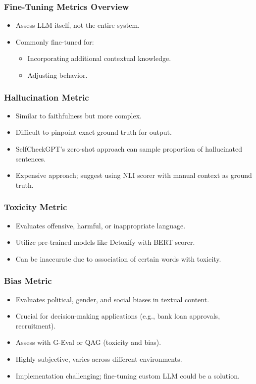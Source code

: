 \begin{frame}[fragile]\frametitle{Fine-Tuning Metrics Overview}
  \begin{itemize}
    \item Assess LLM itself, not the entire system.
    \item Commonly fine-tuned for:
      \begin{itemize}
        \item Incorporating additional contextual knowledge.
        \item Adjusting behavior.
      \end{itemize}
  \end{itemize}
\end{frame}

\begin{frame}[fragile]\frametitle{Hallucination Metric}
  \begin{itemize}
    \item Similar to faithfulness but more complex.
    \item Difficult to pinpoint exact ground truth for output.
    \item SelfCheckGPT's zero-shot approach can sample proportion of hallucinated sentences.
    \item Expensive approach; suggest using NLI scorer with manual context as ground truth.
  \end{itemize}
\end{frame}

\begin{frame}[fragile]\frametitle{Toxicity Metric}
  \begin{itemize}
    \item Evaluates offensive, harmful, or inappropriate language.
    \item Utilize pre-trained models like Detoxify with BERT scorer.
    \item Can be inaccurate due to association of certain words with toxicity.
  \end{itemize}
\end{frame}

\begin{frame}[fragile]\frametitle{Bias Metric}
  \begin{itemize}
    \item Evaluates political, gender, and social biases in textual content.
    \item Crucial for decision-making applications (e.g., bank loan approvals, recruitment).
    \item Assess with G-Eval or QAG (toxicity and bias).
    \item Highly subjective, varies across different environments.
    \item Implementation challenging; fine-tuning custom LLM could be a solution.
  \end{itemize}
\end{frame}

